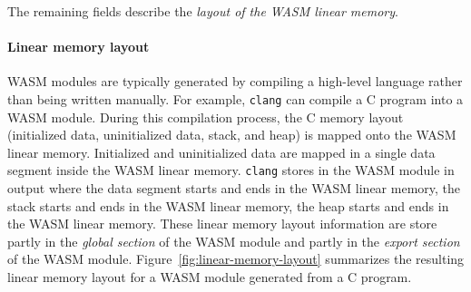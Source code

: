 \documentclass{article}
\begin{document}
The remaining fields describe the \textit{layout of the WASM linear memory}.

\paragraph{Linear memory layout}

WASM modules are typically generated by compiling a high-level language
rather than being written manually. For example, \verb|clang| can compile a
C program into a WASM module.
During this compilation process, the C memory layout (initialized data, uninitialized data, stack, and heap) is mapped onto the WASM linear memory.
Initialized and uninitialized data are mapped in a single data segment inside the WASM linear memory.
\texttt{clang} stores in the WASM module in output where the data segment starts and ends in the WASM linear memory, the stack starts and ends in the WASM linear memory, the heap starts and ends in the WASM linear memory.
These linear memory layout information are store partly in the \textit{global section} of the WASM module and partly in the \textit{export section} of the WASM module.
Figure~\ref{fig:linear-memory-layout} summarizes the resulting linear memory
layout for a WASM module generated from a C program.
\end{document}
